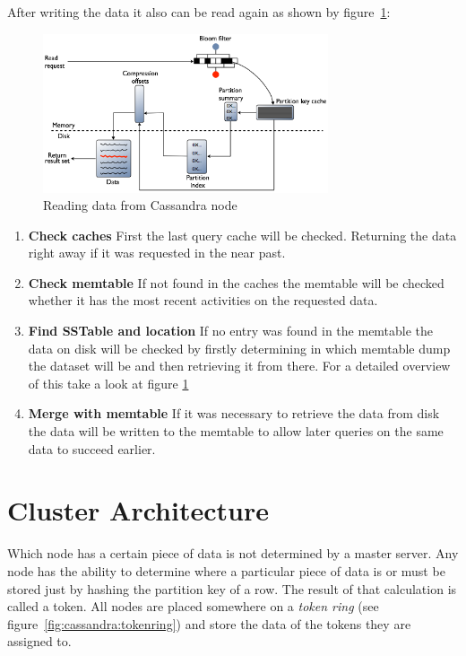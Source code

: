 After writing the data it also can be read again as shown by figure~\ref{fig:cassandra:readData}:

\begin{figure}[ht]
    \centering
    \includegraphics[width=0.75\textwidth]{img/cassandra_local_read.png}
    \caption{Reading data from Cassandra node \autocite{datastaxReadData}}
    \label{fig:cassandra:readData}
\end{figure}
\begin{enumerate}
    \item \textbf{Check caches} First the last query cache will be checked. Returning the data right away if it was requested in the near past.
    \item \textbf{Check memtable} If not found in the caches the memtable will be checked whether it has the most recent activities on the requested data.
    \item \textbf{Find SSTable and location} If no entry was found in the memtable the data on disk will be checked by firstly determining in which memtable dump the dataset will be and then retrieving it from there. For a detailed overview of this take a look at figure \ref{fig:cassandra:readData}
    \item \textbf{Merge with memtable} If it was necessary to retrieve the data from disk the data will be written to the memtable to allow later queries on the same data to succeed earlier.
\end{enumerate}

\section{Cluster Architecture}\label{sec:CassandraClusterArchitecture}  %
Which node has a certain piece of data is not determined by a master server. Any node has the ability to determine where a particular piece of data is or must be stored just by hashing the partition key of a row. The result of that calculation is called a token. All nodes are placed somewhere on a \textit{token ring} (see figure~\ref{fig:cassandra:tokenring}) and store the data of the tokens they are assigned to.\autocite[2]{cassandra_paper} \autocite[209,210]{decandia2007dynamo}

